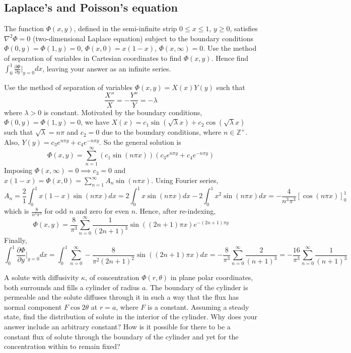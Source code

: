 \documentclass[a4paper]{article}
\begin{document}
\subsection*{Laplace's and Poisson's equation}
\begin{qns}[Cartesian]
The function $\Phi(x,y)$, defined in the semi-infinite strip $0\leq x\leq1$, $y\geq0$, satisfies $\nabla^2\Phi=0$ (two-dimensional Laplace equation) subject to the boundary conditions $\Phi(0,y)=\Phi(1,y)=0$, $\Phi(x,0)=x(1-x)$, $\Phi(x,\infty)=0$. Use the method of separation of variables in Cartesian coordinates to find $\Phi(x,y)$. Hence find $\int_0^1\frac{\partial\Phi}{\partial y}|_{y=0}dx$, leaving your answer as an infinite series.
\end{qns}
\begin{ans}
Use the method of separation of variables $\Phi(x,y)=X(x)Y(y)$ such that $$\frac{X''}{X}=-\frac{Y''}{Y}=-\lambda$$ where $\lambda>0$ is constant. Motivated by the boundary conditions, $\Phi(0,y)=\Phi(1,y)=0$, we have $X(x)=c_1\sin(\sqrt{\lambda}x)+c_2\cos(\sqrt{\lambda}x)$ such that $\sqrt{\lambda}=n\pi$ and $c_2=0$ due to the boundary conditions, where $n\in\mathbb{Z}^+$. Also, $Y(y)=c_3e^{n\pi y}+c_4e^{-n\pi y}$. So the general solution is
$$\Phi(x,y)=\sum_{n=1}^\infty(c_1\sin(n\pi x))(c_3e^{n\pi y}+c_4e^{-n\pi y})$$
Imposing $\Phi(x,\infty)=0\implies c_3=0$ and $x(1-x)=\Phi(x,0)=\sum_{n=1}^\infty A_n\sin(n\pi x)$. Using Fourier series,
$$A_n=\frac{2}{1}\int_0^1x(1-x)\sin(n\pi x)dx=2\int_0^1x\sin(n\pi x)dx-2\int_0^1x^2\sin(n\pi x)dx=-\frac{4}{n^3\pi^3}[\cos(n\pi x)]_0^1$$
which is $\frac{8}{n^3\pi^3}$ for odd $n$ and zero for even $n$. Hence, after re-indexing,
$$\Phi(x,y)=\frac{8}{\pi^3}\sum_{n=0}^\infty\frac{1}{(2n+1)^3}\sin((2n+1)\pi x)e^{-(2n+1)\pi y}$$
Finally,
$$\int_0^1\frac{\partial\Phi}{\partial y}\bigg|_{y=0}dx=\int_0^1\sum_{n=0}^\infty-\frac{8}{\pi^2(2n+1)^2}\sin((2n+1)\pi x)dx=-\frac{8}{\pi^3}\sum_{n=0}^\infty\frac{2}{(n+1)^3}=-\frac{16}{\pi^3}\sum_{n=0}^\infty\frac{1}{(n+1)^3}$$
\end{ans}
\newpage
\begin{qns}
A solute with diffusivity $\kappa$, of concentration $\Phi(r,\theta)$ in plane polar coordinates, both surrounds and fills a cylinder of radius $a$. The boundary of the cylinder is permeable and the solute diffuses through it in such a way that the flux has normal component $F\cos2\theta$ at $r = a$, where $F$ is a constant. Assuming a steady state, find the distribution of solute in the interior of the cylinder. Why does your answer include an arbitrary constant? How is it possible for there to be a constant flux of solute through the boundary of the cylinder and yet for the concentration within to remain fixed?
\end{qns}
\end{document}
